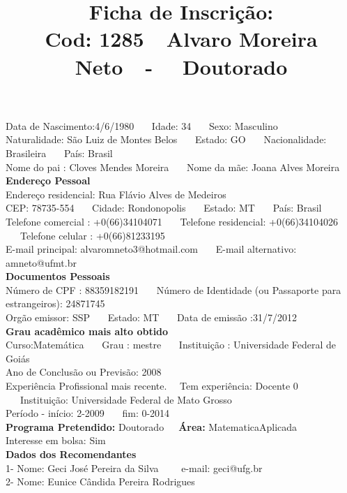 \documentclass[11pt]{article}
\title{\vspace*{-4cm} Ficha de Inscrição: \\Cod: 1285\ \ Alvaro Moreira Neto\ \ - \ \ Doutorado 
 }
\date{}
\begin{document}
\maketitle
\vspace*{-1.5cm}
\noindent Data de Nascimento:4/6/1980
\ \ \ Idade: 34   \ \ \ Sexo: Masculino
\\
Naturalidade: São Luiz de Montes Belos  
\ \ \  Estado: GO
\ \ \  Nacionalidade: Brasileira
\ \ \ País: Brasil
\\        
Nome do pai : Cloves Mendes Moreira
\ \ \ Nome da mãe: Joana Alves Moreira          
\\[0.2cm]                     
\textbf{Endereço Pessoal} 
\\ 
\noindent Endereço residencial: Rua Flávio Alves de Medeiros
\\
        CEP: 78735-554 
\ \ \ Cidade: Rondonopolis 
\ \ \ Estado: MT 
\ \ \ País: Brasil
\\		
		Telefone comercial : +0(66)34104071
\ \ \ Telefone residencial: +0(66)34104026
\ \ \ Telefone celular : +0(66)81233195
\\
E-mail principal: alvaromneto3@hotmail.com
\ \ \ E-mail alternativo: amneto@ufmt.br 
\\[0.2cm] 
\textbf{Documentos Pessoais}
\\
\noindent Número de CPF : 88359182191
\ \ \ Número de Identidade (ou Passaporte para estrangeiros): 24871745
\\
Orgão emissor: SSP
\ \ \ Estado: MT
\ \ \ Data de emissão :31/7/2012
\\[0.3cm]
\textbf{Grau acadêmico mais alto obtido}
\\	
Curso:Matemática
\ \ \ Grau : mestre
\ \ \ Instituição : Universidade Federal de Goiás
\\			
Ano de Conclusão ou Previsão: 2008
\\ 
Experiência Profissional mais recente. \ \  
Tem experiência: Docente 0  
\ \ \ Instituição: Universidade Federal de Mato Grosso
\\  
Período - início: 2-2009
\ \ \ fim: 0-2014
\\[0.2cm] 
\textbf{Programa Pretendido:} Doutorado\ \ \ \textbf{Área:} MatematicaAplicada\\
Interesse em bolsa: Sim
\\[0.3cm]		
\textbf{Dados dos Recomendantes} 
\\
1- Nome: Geci José Pereira da Silva
\ \ \ \  e-mail: geci@ufg.br 
\\
2- Nome: Eunice Cândida Pereira Rodrigues
\end{document}
